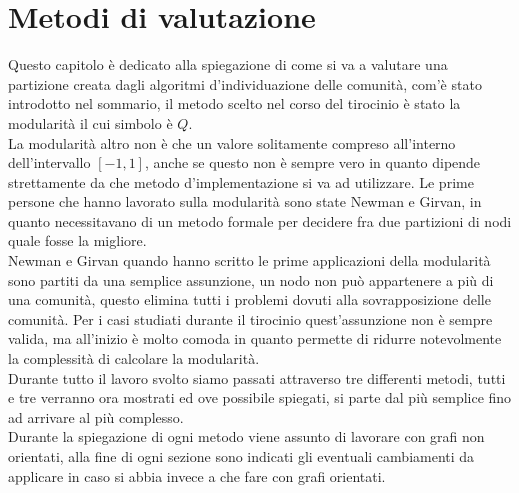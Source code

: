 %
%
\chapter{Metodi di valutazione}
Questo capitolo è dedicato alla spiegazione di come si va a valutare una partizione creata dagli algoritmi d'individuazione delle comunità, com'è stato introdotto nel sommario, il metodo scelto nel corso del tirocinio è stato la modularità il cui simbolo è $Q$.\\
La modularità altro non è che un valore solitamente compreso all'interno dell'intervallo $[-1, 1]$, anche se questo non è sempre vero in quanto dipende strettamente da che metodo d'implementazione si va ad utilizzare. Le prime persone che hanno lavorato sulla modularità sono state Newman e Girvan, in quanto necessitavano di un metodo formale per decidere fra due partizioni di nodi quale fosse la migliore.\\
Newman e Girvan quando hanno scritto le prime applicazioni della modularità sono partiti da una semplice assunzione, un nodo non può appartenere a più di una comunità, questo elimina tutti i problemi dovuti alla sovrapposizione delle comunità. Per i casi studiati durante il tirocinio quest'assunzione non è sempre valida, ma all'inizio è molto comoda in quanto permette di ridurre notevolmente la complessità di calcolare la modularità.\\
Durante tutto il lavoro svolto siamo passati attraverso tre differenti metodi, tutti e tre verranno ora mostrati ed ove possibile spiegati, si parte dal più semplice fino ad arrivare al più complesso.\\ Durante la spiegazione di ogni metodo viene assunto di lavorare con grafi non orientati, alla fine di ogni sezione sono indicati gli eventuali cambiamenti da applicare in caso si abbia invece a che fare con grafi orientati.
%
